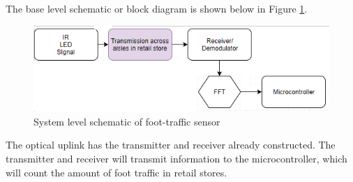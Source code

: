 



The base level schematic or block diagram is shown below in Figure \ref{fig:blockproposal}.
\begin{figure}
	\centering
	\includegraphics[width=0.7\linewidth]{Proposed_work/blockproposal}
	\caption{System level schematic of foot-traffic sensor}
	\label{fig:blockproposal}
\end{figure}

The optical uplink has the transmitter and receiver already constructed. The transmitter and receiver will transmit information to the microcontroller, which will count the amount of foot traffic in retail stores. 


